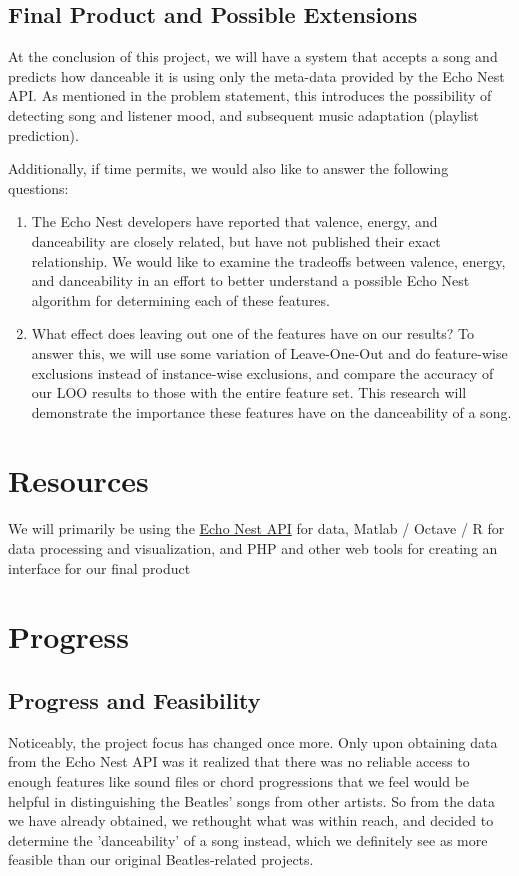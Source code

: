 \documentclass{article}
\begin{document}
\subsection{Final Product and Possible Extensions}
At the conclusion of this project, we will have a system that accepts a song and predicts how danceable it is using only the meta-data provided by the Echo Nest API. As mentioned in the problem statement, this introduces the possibility of detecting song and listener mood, and subsequent music adaptation (playlist prediction).

Additionally, if time permits, we would also like to answer the following questions:

\begin{enumerate}
\item The Echo Nest developers have reported that valence, energy, and danceability are closely related, but have not published their exact relationship. We would like to examine the tradeoffs between valence, energy, and danceability in an effort to better understand a possible Echo Nest algorithm for determining each of these features.
\item What effect does leaving out one of the features have on our results? To answer this, we will use some variation of Leave-One-Out and do feature-wise exclusions instead of instance-wise exclusions, and compare the accuracy of our LOO results to those with the entire feature set. This research will demonstrate the importance these features have on the danceability of a song.
\end{enumerate}

\section{Resources}
We will primarily be using the
\href{http://developer.echonest.com/docs/v4}{Echo Nest API} for data,
Matlab / Octave / R for data processing and visualization, and PHP and
other web tools for creating an interface for our final product 

\section{Progress}
\subsection{Progress and Feasibility}
Noticeably, the project focus has changed once more. Only upon obtaining
data from the Echo Nest API was it realized that there was no reliable
access to enough features like sound files or chord progressions that we
feel would be helpful in distinguishing the Beatles' songs from other
artists. So from the data we have already obtained, we rethought what was
within reach, and decided to determine the 'danceability' of a song
instead, which we definitely see as more feasible than our original
Beatles-related projects. 
\end{document}

